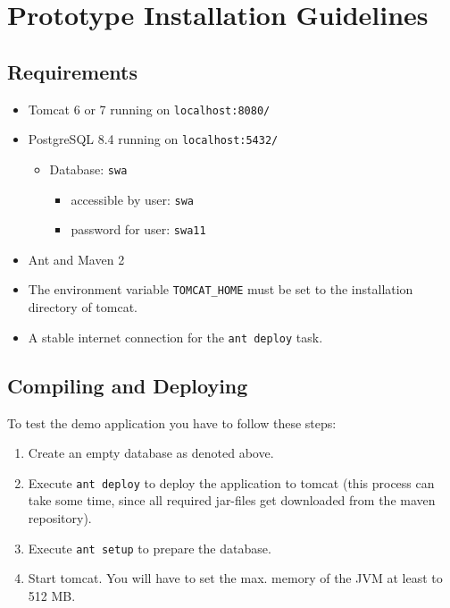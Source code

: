 \documentclass[11pt]{article}
\begin{document}
\newpage

\section{Prototype Installation Guidelines}

\subsection{Requirements}

\begin{itemize}
\item Tomcat 6 or 7 running on \texttt{localhost:8080/}
\item PostgreSQL 8.4 running on \texttt{localhost:5432/}
	\begin{itemize}
	\item Database: \texttt{swa}
		\begin{itemize}
		\item accessible by user: \texttt{swa}
		\item password for user: \texttt{swa11}
		\end{itemize}
	\end{itemize}
\item Ant and Maven 2
\item The environment variable \texttt{TOMCAT\_HOME} must be set to the installation directory of tomcat.
\item A stable internet connection for the \texttt{ant deploy} task.
\end{itemize}

\subsection{Compiling and Deploying}

To test the demo application you have to follow these steps:

\begin{enumerate}
\item Create an empty database as denoted above.
\item Execute \texttt{ant deploy} to deploy the application to tomcat (this process can take some time, since all required jar-files get downloaded from the maven repository).
\item Execute \texttt{ant setup} to prepare the database.
\item Start tomcat. You will have to set the max. memory of the JVM at least to 512 MB.
\end{enumerate}
\end{document}
